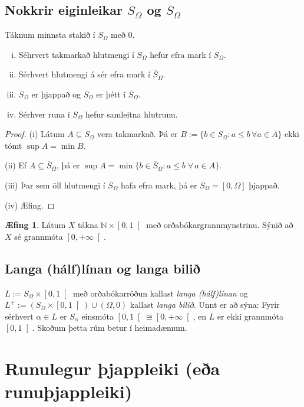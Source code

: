 \documentclass[a4paper,icelandic]{book}
\theoremstyle{definition}
\newtheorem*{aefing}{Æfing}
\theoremstyle{plain}
\theoremstyle{remark}
\newcommand{\N}{\mathbb{N}} %
\begin{document}
\subsection{Nokkrir eiginleikar $S_\Omega$ og $\overline S_\Omega$}
Táknum minnsta stakið í $S_\Omega$ með $0$.
\begin{enumerate}[(i)]
\item Séhrvert takmarkað hlutmengi í $S_\Omega$ hefur efra mark í $S_\Omega$.
\item Sérhvert hlutmengi á sér efra mark í $\overline S_\Omega$.
\item $\overline S_\Omega$ er þjappað og $S_\Omega$ er þétt í
  $\overline S_\Omega$.
\item Sérhver runa í $S_\Omega$ hefur samleitna hlutrunu.
\end{enumerate}
\begin{proof}
  (i) Látum $A\subseteq S_\Omega$ vera takmarkað. Þá er $B := \{b\in
  S_\Omega : a\leq b \,\forall a\in A\}$ ekki tómt $\sup A = \min B$.

  (ii)  Ef $A\subseteq \overline S_\Omega$, þá er $\sup A =
  \min\{b\in\overline S_\Omega : a\leq b \;\forall\,a\in A\}$.

  (iii) Þar sem öll hlutmengi í $\overline S_\Omega$ hafa efra mark,
  þá er $\overline S_\Omega = \left[0,\Omega\right]$ þjappað.

  (iv) Æfing.
\end{proof}
\begin{aefing}
  Látum $X$ tákna $\N\times\left[0,1\right[$ með
  orðabókargrannmynstrinu. Sýnið að $X$ sé grannmóta
  $\left[0,+\infty\right[$.
\end{aefing}

\subsection{Langa (hálf)línan og langa bilið}

$L := S_\Omega \times\left[0,1\right[$ með orðabókarröðun kallast
\emph{langa (hálf)línan} og $L^+ :=
(S_\Omega\times\left[0,1\right[)\cup(\Omega,0)$ kallast \emph{langa
  bilið}. Unnt er að sýna: Fyrir sérhvert
$\alpha\in L$ er $S_\alpha$ einsmóta
$\left[0,1\right[\cong\left[0,+\infty\right[$, en $L$ er ekki
grannmóta $\left[0,1\right[$. Skoðum þetta rúm betur í heimadæmum.


\section{Runulegur þjappleiki (eða runuþjappleiki)}
\end{document}
